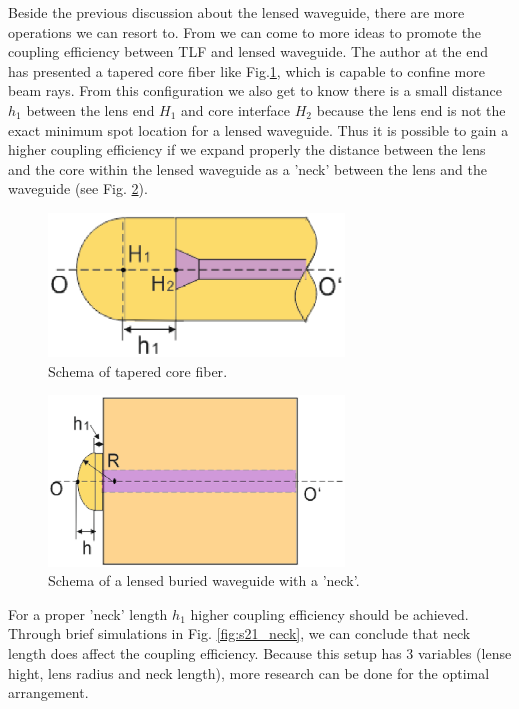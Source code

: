 Beside the previous discussion about the lensed waveguide, there are more operations we can resort to. From \cite{integrated_coupling_between_LD_SMF} we can come to more ideas to promote the coupling efficiency between TLF and lensed waveguide. The author at the end has presented a tapered core fiber like Fig.\ref{fig:tapered_core_fiber}, which is capable to confine more beam rays. From this configuration we also get to know there is a small distance $h_{1}$ between the lens end $H_{1}$ and core interface $H_{2}$ because the lens end is not the exact minimum spot location for a lensed waveguide. Thus it is possible to gain a higher coupling efficiency if we expand properly the distance between the lens and the core within the lensed waveguide as a 'neck' between the lens and the waveguide (see Fig. \ref{fig:lensed_waveguide_neck}).\\ 

\begin{figure}[!ht]
\centering
\includegraphics[width=0.7\textwidth]{bilder/tapered_core_fiber}
\caption {Schema of tapered core fiber\cite{integrated_coupling_between_LD_SMF}.}
\label{fig:tapered_core_fiber}
\end{figure}
\begin{figure}[!ht]
\centering
\includegraphics[width=0.7\textwidth]{bilder/lensed_waveguide_neck}
\caption {Schema of a lensed buried waveguide with a 'neck'.}
\label{fig:lensed_waveguide_neck}
\end{figure}
For a proper 'neck' length $h_{1}$ higher coupling efficiency should be achieved. Through brief simulations in Fig. \ref{fig:s21_neck}, we can conclude that neck length does affect the coupling efficiency. Because this setup has 3 variables (lense hight, lens radius and neck length), more research can be done for the optimal arrangement.\\

